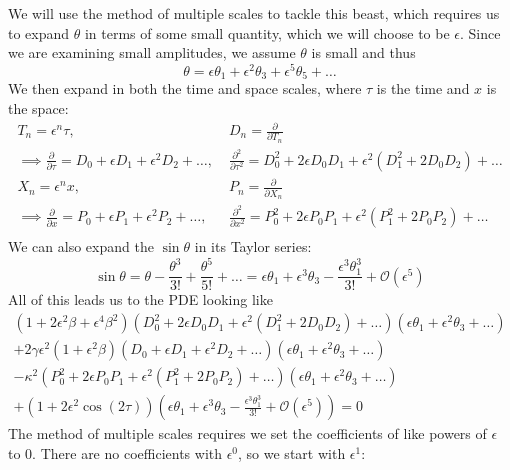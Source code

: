 \documentclass[11pt]{article}
\numberwithin{equation}{section}
\numberwithin{figure}{section}
\numberwithin{table}{section}
\begin{document}
We will use the method of multiple scales to tackle this beast, which requires us to expand $\theta$ in terms of some small quantity, which we will choose to be $\epsilon$. Since we are examining small amplitudes, we assume $\theta$ is small and thus
\begin{equation}
    \theta=\epsilon\theta_1+\epsilon^2\theta_3+\epsilon^5\theta_5+\dots
    \label{eqn:expansion of theta}
\end{equation}
We then expand in both the time and space scales, where $\tau$ is the time and $x$ is the space:
\begin{align*}
    T_n=\epsilon^n\tau,&\; D_n=\frac{\partial}{\partial T_n}\\
    \implies\frac{\partial}{\partial\tau}=D_0+\epsilon D_1+\epsilon^2 D_2+\dots,&\; \frac{\partial^2}{\partial\tau^2}=D_0^2+2\epsilon D_0D_1+\epsilon^2(D_1^2+2D_0D_2)+\dots\\
    X_n=\epsilon^n x,&\; P_n=\frac{\partial}{\partial X_n}\\
    \implies\frac{\partial}{\partial x}=P_0+\epsilon P_1+\epsilon^2 P_2+\dots,&\; \frac{\partial^2}{\partial x^2}=P_0^2+2\epsilon P_0P_1+\epsilon^2(P_1^2+2P_0P_2)+\dots\\
\end{align*}
We can also expand the $\sin\theta$ in its Taylor series:
\begin{equation*}
    \sin\theta=\theta-\frac{\theta^3}{3!}+\frac{\theta^5}{5!}+\dots=\epsilon\theta_1+\epsilon^3\theta_3-\frac{\epsilon^3\theta_1^3}{3!}+\mathcal{O}(\epsilon^5)
\end{equation*}
All of this leads us to the PDE looking like
\begin{equation}
    \begin{aligned}
        (1+2\epsilon^2\beta+\epsilon^4\beta^2)(D_0^2+2\epsilon D_0D_1+\epsilon^2(D_1^2+2D_0D_2)+\dots)(\epsilon\theta_1+\epsilon^2\theta_3+\dots)\\
        +2\gamma\epsilon^2(1+\epsilon^2\beta)(D_0+\epsilon D_1+\epsilon^2 D_2+\dots)(\epsilon\theta_1+\epsilon^2\theta_3+\dots)\\
        -\kappa^2(P_0^2+2\epsilon P_0P_1+\epsilon^2(P_1^2+2P_0P_2)+\dots)(\epsilon\theta_1+\epsilon^2\theta_3+\dots)\\
        +(1+2\epsilon^2\cos(2\tau))(\epsilon\theta_1+\epsilon^3\theta_3-\frac{\epsilon^3\theta_1^3}{3!}+\mathcal{O}(\epsilon^5))=0
    \end{aligned}
    \label{eqn:PDE expanded}
\end{equation}
The method of multiple scales requires we set the coefficients of like powers of $\epsilon$ to 0. There are no coefficients with $\epsilon^0$, so we start with $\epsilon^1$:
\end{document}
